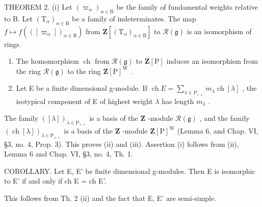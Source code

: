 THEOREM 2. (i) Let \((\varpi_{\alpha})_{\alpha \in \mathrm{B}}\) be the family of fundamental weights relative to B. Let \((\mathrm{T}_{\alpha})_{\alpha \in \mathrm{B}}\) be a family of indeterminates. The map \(f\mapsto f(\left([ \varpi_{\alpha} ]\right)_{\alpha \in \mathrm{B}})\) from \(\mathbf{Z}[(\mathrm{T}_{\alpha})_{\alpha \in \mathrm{B}}]\) to \(\mathcal{R}(\mathfrak{g})\) is an isomorphism of rings.

\begin{enumerate}
\def\labelenumi{(\roman{enumi})}
\setcounter{enumi}{1}
\item
  The homomorphism \(\operatorname{ch}\) from \(\mathcal{R}(\mathfrak{g})\) to \(\mathbf{Z}[\mathrm{P}]\) induces an isomorphism from the ring \(\mathcal{R}(\mathfrak{g})\) to the ring \(\mathbf{Z}[\mathrm{P}]^{\mathrm{W}}\) .
\item
  Let E be a finite dimensional g-module. If \(\operatorname{ch} E = \sum_{\lambda \in P_{++}} m_{\lambda} \operatorname{ch}[\lambda]\) , the isotypical component of E of highest weight \(\lambda\) has length \(m_{\lambda}\) .
\end{enumerate}

The family \(([\lambda])_{\lambda \in \mathrm{P}_{++}}\) is a basis of the \(\mathbf{Z}\) -module \(\mathcal{R}(\mathfrak{g})\) , and the family \((\operatorname{ch}[\lambda])_{\lambda \in \mathrm{P}_{++}}\) is a basis of the \(\mathbf{Z}\) -module \(\mathbf{Z}[\mathrm{P}]^{\mathrm{W}}\) (Lemma 6, and Chap. VI, §3, no. 4, Prop. 3). This proves (ii) and (iii). Assertion (i) follows from (ii), Lemma 6 and Chap. VI, §3, no. 4, Th. 1.

COROLLARY. Let E, E' be finite dimensional g-modules. Then E is isomorphic to E' if and only if ch E = ch E'.

This follows from Th. 2 (ii) and the fact that E, E' are semi-simple.

